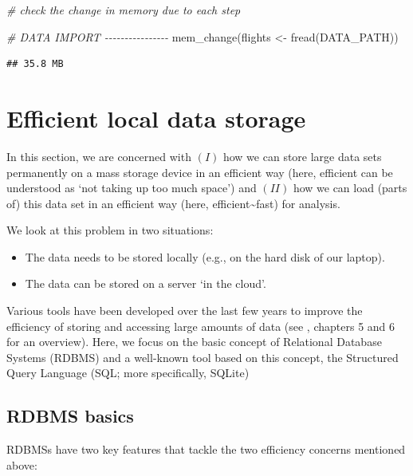 \documentclass[
  12pt,
]{style/krantz}
\newenvironment{Shaded}{\begin{snugshade}}{\end{snugshade}}
\newcommand{\CommentTok}[1]{\textcolor[rgb]{0.56,0.35,0.01}{\textit{#1}}}
\newcommand{\FunctionTok}[1]{\textcolor[rgb]{0.00,0.00,0.00}{#1}}
\newcommand{\NormalTok}[1]{#1}
\newcommand{\OtherTok}[1]{\textcolor[rgb]{0.56,0.35,0.01}{#1}}
\providecommand{\tightlist}{%
  \setlength{\itemsep}{0pt}\setlength{\parskip}{0pt}}
\begin{document}
\begin{Shaded}
\begin{Highlighting}[]
\CommentTok{\# check the change in memory due to each step}

\CommentTok{\# DATA IMPORT {-}{-}{-}{-}{-}{-}{-}{-}{-}{-}{-}{-}{-}{-}{-}{-}}
\FunctionTok{mem\_change}\NormalTok{(flights }\OtherTok{\textless{}{-}} \FunctionTok{fread}\NormalTok{(DATA\_PATH))}
\end{Highlighting}
\end{Shaded}

\begin{verbatim}
## 35.8 MB
\end{verbatim}

\hypertarget{efficient-local-data-storage}{%
\section{Efficient local data storage}\label{efficient-local-data-storage}}

In this section, we are concerned with \((I)\) how we can store large data sets permanently on a mass storage device in an efficient way (here, efficient can be understood as `not taking up too much space') and \((II)\) how we can load (parts of) this data set in an efficient way (here, efficient\textasciitilde fast) for analysis.

We look at this problem in two situations:

\begin{itemize}
\tightlist
\item
  The data needs to be stored locally (e.g., on the hard disk of our laptop).
\item
  The data can be stored on a server `in the cloud'.
\end{itemize}

Various tools have been developed over the last few years to improve the efficiency of storing and accessing large amounts of data (see \citet{walkowiak_2016}, chapters 5 and 6 for an overview). Here, we focus on the basic concept of Relational Database Systems (RDBMS) and a well-known tool based on this concept, the Structured Query Language (SQL; more specifically, SQLite)

\hypertarget{rdbms-basics}{%
\subsection{RDBMS basics}\label{rdbms-basics}}

RDBMSs have two key features that tackle the two efficiency concerns mentioned above:
\end{document}
